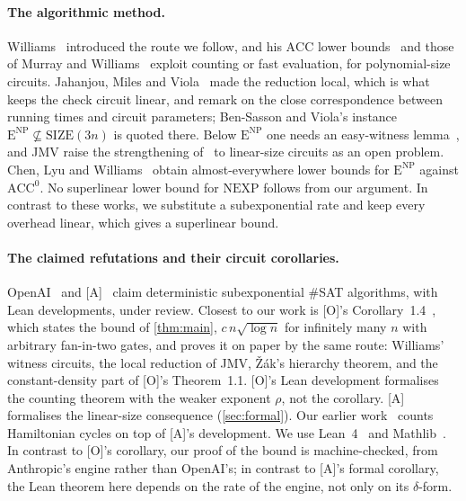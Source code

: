 \documentclass[10pt]{amsart}
\theoremstyle{plain}
\theoremstyle{definition}
\theoremstyle{remark}
\numberwithin{equation}{section}
\newcommand{\ENP}{\mathrm{E}^{\mathrm{NP}}}
\newcommand{\SIZE}{\mathrm{SIZE}}
\newcommand{\A}{\textup{[A]}}
\newcommand{\Oa}{\textup{[O]}}
\begin{document}
\paragraph{The algorithmic method.} Williams~\cite[Lemma~3.2, Theorem~6.1]{Wil13} introduced the
route we follow, and his $\mathrm{ACC}$ lower bounds~\cite{Wil14} and those of Murray and
Williams~\cite{MW18} exploit counting or fast evaluation, for polynomial-size circuits. Jahanjou,
Miles and Viola~\cite{JMV15} made the reduction local, which is what keeps the check circuit linear,
and remark on the close correspondence between running times and circuit parameters; Ben-Sasson and
Viola's instance $\ENP\not\subseteq\SIZE(3n)$ is quoted there. Below $\ENP$ one needs an easy-witness
lemma~\cite{IKW02,MW18}, and JMV raise the strengthening of~\cite{IKW02} to linear-size circuits as an
open problem. Chen, Lyu and Williams~\cite{CLW20} obtain almost-everywhere lower bounds for $\ENP$
against $\mathrm{ACC}^0$. No superlinear lower bound for $\mathrm{NEXP}$ follows from our argument.
In contrast to these works, we substitute a subexponential rate and keep every overhead linear,
which gives a superlinear bound.

\paragraph{The claimed refutations and their circuit corollaries.} OpenAI~\cite{OpenAI26} and
\A~\cite{Anthropic26} claim deterministic subexponential $\#$SAT algorithms, with Lean developments,
under review. Closest to our work is \Oa's Corollary~1.4~\cite[Corollary~1.4]{OpenAI26}, which states
the bound of \cref{thm:main}, $c\,n\sqrt{\log n}$ for infinitely many $n$ with arbitrary fan-in-two
gates, and proves it on paper by the same route: Williams' witness circuits, the local reduction of
JMV, \v{Z}\'ak's hierarchy theorem, and the constant-density part of \Oa's Theorem~1.1. \Oa's Lean
development formalises the counting theorem with the weaker exponent $\rho$, not the corollary. \A{}
formalises the linear-size consequence (\cref{sec:formal}). Our earlier work~\cite{Tulsyan26} counts
Hamiltonian cycles on top of \A's development. We use Lean~4~\cite{Lean4} and
Mathlib~\cite{Mathlib20}. In contrast to \Oa's corollary, our proof of the bound is machine-checked,
from Anthropic's engine rather than OpenAI's; in contrast to \A's formal corollary, the Lean theorem
here depends on the rate of the engine, not only on its $\delta$-form.
\end{document}
